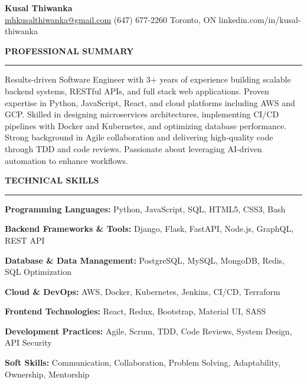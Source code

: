 \documentclass[10pt,letterpaper]{article}
\begin{document}
\begin{center}
{\LARGE\textbf{Kusal Thiwanka}}\\[3pt]
\href{mailto:mhkusalthiwanka@gmail.com}{mhkusalthiwanka@gmail.com}\hspace{2em}%
(647) 677{-}2260\hspace{2em}%
Toronto, ON\hspace{2em}
linkedin.com/in/kusal-thiwanka
\end{center}

\vspace{6pt}

\textbf{PROFESSIONAL SUMMARY}\\[-8pt]
\noindent\rule{\textwidth}{1pt}

\vspace{-2pt}

Results-driven Software Engineer with 3+ years of experience building scalable backend systems, RESTful APIs, and full stack web applications. Proven expertise in Python, JavaScript, React, and cloud platforms including AWS and GCP. Skilled in designing microservices architectures, implementing CI/CD pipelines with Docker and Kubernetes, and optimizing database performance. Strong background in Agile collaboration and delivering high-quality code through TDD and code reviews. Passionate about leveraging AI-driven automation to enhance workflows.

\vspace{8pt}

\textbf{TECHNICAL SKILLS}\\[-8pt]
\noindent\rule{\textwidth}{1pt}

\vspace{-2pt}

\textbf{Programming Languages:} Python, JavaScript, SQL, HTML5, CSS3, Bash

\textbf{Backend Frameworks \& Tools:} Django, Flask, FastAPI, Node.js, GraphQL, REST API

\textbf{Database \& Data Management:} PostgreSQL, MySQL, MongoDB, Redis, SQL Optimization

\textbf{Cloud \& DevOps:} AWS, Docker, Kubernetes, Jenkins, CI/CD, Terraform

\textbf{Frontend Technologies:} React, Redux, Bootstrap, Material UI, SASS

\textbf{Development Practices:} Agile, Scrum, TDD, Code Reviews, System Design, API Security

\textbf{Soft Skills:} Communication, Collaboration, Problem Solving, Adaptability, Ownership, Mentorship
\end{document}
